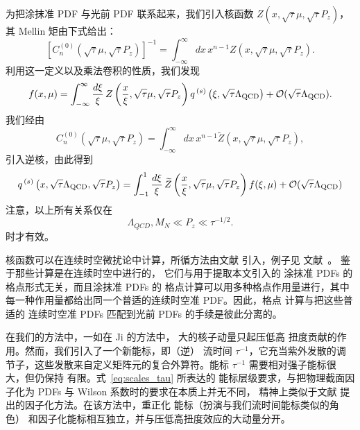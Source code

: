 为把涂抹准 PDF 与光前
PDF 联系起来，我们引入核函数 $Z(x,\sqrt{\tau}\mu,\sqrt{\tau}P_z)$，其 Mellin 矩由下式给出：
\begin{equation}\label{eq:cinvz}
 \left[C_n^{(0)}(\sqrt{\tau}\mu, \sqrt{\tau}P_z)\right]^{-1} =
\int_{-\infty}^{\infty} dx\, x^{n-1}
Z(x,\sqrt{\tau}\mu, \sqrt{\tau}P_z).
\end{equation}
利用这一定义以及乘法卷积的性质，我们发现
\begin{equation}
f(x,\mu) =  \int_{-\infty}^{\infty} \frac{d\xi}{\xi}\,
Z\left(\frac{x}{\xi},\sqrt{\tau}\mu, \sqrt{\tau}P_z\right)
q^{\,(s)}\left(\xi,\sqrt{\tau} \Lambda_{\mathrm{QCD}}\right) + {\cal
O}(\sqrt{\tau}\Lambda_{\mathrm{QCD}}).
\end{equation}
我们经由
\begin{equation}
C_n^{(0)}(\sqrt{\tau}\mu, \sqrt{\tau}P_z) = \int_{-\infty}^{\infty} dx\,
x^{n-1}
\widetilde{Z}(x,\sqrt{\tau}\mu, \sqrt{\tau}P_z),
\end{equation}
引入逆核，由此得到
\begin{equation}
q^{\,(s)}\left(x,\sqrt{\tau} \Lambda_{\mathrm{QCD}}, \sqrt{\tau}P_z\right) =
\int_{-1}^{1}
\frac{d\xi}{\xi}\, \widetilde{Z}\left(\frac{x}{\xi},\sqrt{\tau}\mu,
\sqrt{\tau}P_z\right)
f(\xi,\mu) +
{\cal O}(\sqrt{\tau}\Lambda_{\mathrm{QCD}})
\end{equation}
注意，以上所有关系仅在
\begin{equation}\label{eq:scales_tau}
\Lambda_{QCD},M_N\ll P_z \ll \tau^{-1/2}.
\end{equation}
时才有效。

核函数可以在连续时空微扰论中计算，所循方法由文献 \cite{Luscher:2011bx} 引入，例子见
文献~\cite{Ma:2014jla,Ji:2015jwa,Chen:2016fxx,Ishikawa:2016znu}。
鉴于那些计算是在连续时空中进行的，
它们与用于提取本文引入的
涂抹准 PDFs 的格点形式无关，而且涂抹准 PDFs 的
格点计算可以用多种格点作用量进行，其中每一种作用量都给出同一个普适的连续时空准 PDF。因此，格点
计算与把这些普适的
连续时空准 PDFs 匹配到光前 PDFs 的手续是彼此分离的。

在我们的方法中，一如在 Ji 的方法中，
大的核子动量只起压低高
扭度贡献的作用。然而，我们引入了一个新能标，即（逆）
流时间 $\tau^{-1}$，它充当紫外发散的调节子，这些发散来自定义矩阵元的复合外算符。能标
$\tau^{-1}$ 需要相对强子能标很大，但仍保持
有限。式~\eqref{eq:scales_tau} 所表达的
能标层级要求，与把物理截面因子化为 PDFs 与 Wilson 系数时的要求在本质上并无不同，
精神上类似于文献
\cite{Ma:2014jla,Ishikawa:2016znu} 提出的因子化方法。在该方法中，重正化
能标（扮演与我们流时间能标类似的角色）
和因子化能标相互独立，并与压低高扭度效应的大动量分开。

